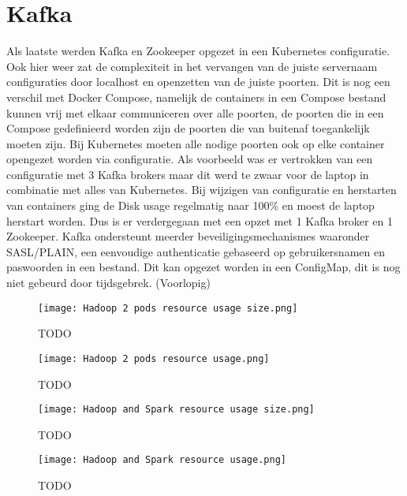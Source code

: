 \section{Kafka}

Als laatste werden Kafka en Zookeeper opgezet in een Kubernetes configuratie. Ook hier weer zat de complexiteit in het vervangen van de juiste servernaam configuraties door localhost en openzetten van de juiste poorten.
Dit is nog een verschil met Docker Compose, namelijk de containers in een Compose bestand kunnen vrij met elkaar communiceren over alle poorten, de poorten die in een Compose gedefinieerd worden zijn de poorten die van buitenaf toegankelijk moeten zijn. Bij Kubernetes moeten alle nodige poorten ook op elke container opengezet worden via configuratie.
\newline
\newline
Als voorbeeld was er vertrokken van een configuratie met 3 Kafka brokers maar dit werd te zwaar voor de laptop in combinatie met alles van Kubernetes. Bij wijzigen van configuratie en herstarten van containers ging de Disk usage regelmatig naar 100\% en moest de laptop herstart worden.
Dus is er verdergegaan met een opzet met 1 Kafka broker en 1 Zookeeper.
\newline
\newline
Kafka ondersteunt meerder beveiligingsmechanismes waaronder SASL/PLAIN, een eenvoudige authenticatie gebaseerd op gebruikersnamen en paswoorden in een bestand.
\newline
\newline
Dit kan opgezet worden in een ConfigMap, dit is nog niet gebeurd door tijdsgebrek. (Voorlopig)
\newline
\newline

\begin{figure}
    \texttt{[image: Hadoop 2 pods resource usage size.png]}
    \caption{TODO}
\end{figure}

\begin{figure}
    \texttt{[image: Hadoop 2 pods resource usage.png]}
    \caption{TODO}
\end{figure}

\begin{figure}
    \texttt{[image: Hadoop and Spark resource usage size.png]}
    \caption{TODO}
\end{figure}

\begin{figure}
    \texttt{[image: Hadoop and Spark resource usage.png]}
    \caption{TODO}
\end{figure}

